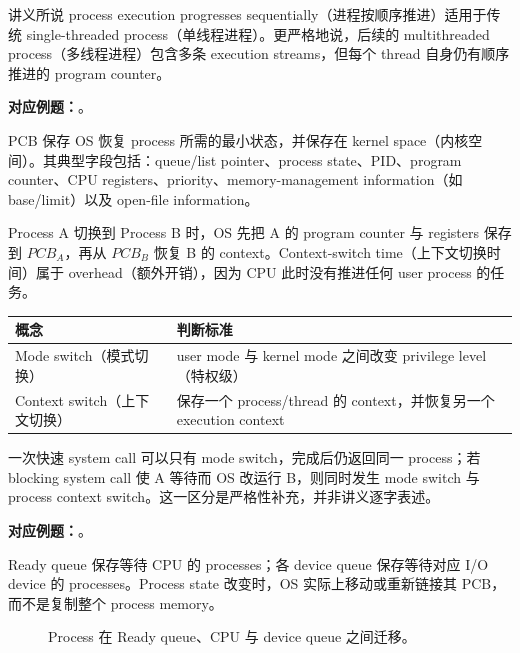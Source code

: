 讲义所说 process execution progresses sequentially（进程按顺序推进）适用于传统 single-threaded process（单线程进程）。更严格地说，后续的 multithreaded process（多线程进程）包含多条 execution streams，但每个 thread 自身仍有顺序推进的 program counter。

\textbf{对应例题：}。


PCB 保存 OS 恢复 process 所需的最小状态，并保存在 kernel space（内核空间）。其典型字段包括：queue/list pointer、process state、PID、program counter、CPU registers、priority、memory-management information（如 base/limit）以及 open-file information。

Process A 切换到 Process B 时，OS 先把 A 的 program counter 与 registers 保存到 $PCB_A$，再从 $PCB_B$ 恢复 B 的 context。Context-switch time（上下文切换时间）属于 overhead（额外开销），因为 CPU 此时没有推进任何 user process 的任务。

\begin{center}
\small
\begin{tabularx}{0.94\textwidth}{@{}>{\raggedright\arraybackslash}p{3.4cm}X@{}}
  \toprule
  概念 & 判断标准 \\
  \midrule
  Mode switch（模式切换） & user mode 与 kernel mode 之间改变 privilege level（特权级） \\
  Context switch（上下文切换） & 保存一个 process/thread 的 context，并恢复另一个 execution context \\
  \bottomrule
\end{tabularx}
\end{center}

一次快速 system call 可以只有 mode switch，完成后仍返回同一 process；若 blocking system call 使 A 等待而 OS 改运行 B，则同时发生 mode switch 与 process context switch。这一区分是严格性补充，并非讲义逐字表述。

\textbf{对应例题：}。


Ready queue 保存等待 CPU 的 processes；各 device queue 保存等待对应 I/O device 的 processes。Process state 改变时，OS 实际上移动或重新链接其 PCB，而不是复制整个 process memory。

\begin{figure}[htbp]
  \centering
  \resizebox{0.98\textwidth}{!}{}
  \caption{Process 在 Ready queue、CPU 与 device queue 之间迁移。}
  \label{fig:sc2005-l03-scheduling-queues}
\end{figure}

